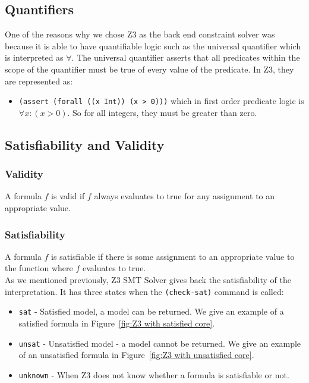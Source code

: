 \documentclass[a4paper]{report}
\begin{document}
\subsection{Quantifiers}
One of the reasons why we chose Z3 as the back end constraint solver was because it is able to have quantifiable logic such as the universal quantifier which is interpreted as  $\forall$. The universal quantifier asserts that all predicates within the scope of the quantifier must be true of every value of the predicate. In Z3, they are represented as:
\begin{itemize}
\item \texttt{(assert (forall ((x Int)) (x > 0)))} which in first order predicate logic is $\forall x: (x > 0)$. So for all integers, they must be greater than zero.
\end{itemize}

\subsection{Satisfiability and Validity}
\subsubsection{Validity}
A formula $f$ is valid if $f$ always evaluates to true for any assignment to an appropriate value. 
\subsubsection{Satisfiability}
A formula $f$ is satisfiable if there is some assignment to an appropriate value to the function where $f$ evaluates to true.\\

As we mentioned previously, Z3 SMT Solver gives back the satisfiability of the interpretation. It has three states when the \texttt{(check-sat)} command is called:
\begin{itemize}
\item \texttt{sat} - Satisfied model, a model can be returned. We give an example of a satisfied formula in Figure~\ref{fig:Z3 with satisfied core}.
\item \texttt{unsat} - Unsatisfied model - a model cannot be returned. We give an example of an unsatisfied formula in Figure~\ref{fig:Z3 with unsatisfied core}.
\item \texttt{unknown} - When Z3 does not know whether a formula is satisfiable or not. %
\end{itemize}
\end{document}
